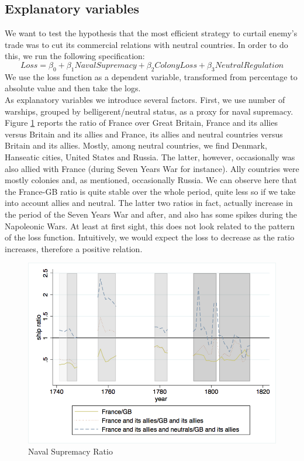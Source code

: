 \documentclass[12pt,a4paper,notitlepage,english]{article}
\begin{document}
\subsection{Explanatory variables}
We want to test the hypothesis that the most efficient strategy to curtail enemy's trade was to cut its commercial relations with neutral countries.
In order to do this, we run the following specification: 
\begin{equation*}
Loss = \beta_0 + \beta_1NavalSupremacy+ \beta_2ColonyLoss+ \beta_3NeutralRegulation
\end{equation*}
We use the loss function as a dependent variable, transformed from percentage to absolute value and then take the logs. \\
As explanatory variables we introduce several factors.
First, we use number of warships, grouped by belligerent/neutral status, as a proxy for naval supremacy. Figure \ref{naval_supremacy_ratios} reports the ratio of France over Great Britain, France and its allies versus Britain and its allies and France, its allies and neutral countries versus Britain and its allies.
Mostly, among neutral countries, we find Denmark, Hanseatic cities, United States and Russia.
The latter, however, occasionally was also allied with France (during Seven Years War for instance).
Ally countries were mostly colonies and, as mentioned, occasionally Russia.
We can observe here that the France-GB ratio is quite stable over the whole period, quite less so if we take into account allies and neutral.
The latter two ratios in fact, actually increase in the period of the Seven Years War and after, and also has some spikes during the Napoleonic Wars.
At least at first sight, this does not look related to the pattern of the loss function.
Intuitively, we would expect the loss to decrease as the ratio increases, therefore a positive relation.
\begin{center}
\begin{figure}[H]
\caption{Naval Supremacy Ratio}
\label{naval_supremacy_ratios}
\centering
\includegraphics[scale=.51]{naval_supremacy_ratios.png}
\end{figure}
\end{center}
\end{document}
